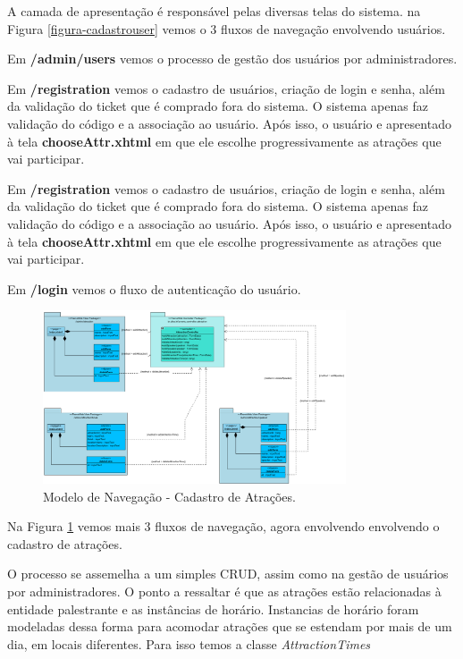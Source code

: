 A camada de apresentação é responsável pelas diversas telas do sistema. na Figura \ref{figura-cadastrouser} vemos o 3 fluxos de navegação envolvendo usuários.

Em \textbf{/admin/users} vemos o processo de gestão dos usuários por administradores.

Em \textbf{/registration} vemos o cadastro de usuários, criação de login e senha, além da validação do ticket que é comprado fora do sistema. O sistema apenas faz validação do código e a associação ao usuário. Após isso, o usuário e apresentado à tela \textbf{chooseAttr.xhtml} em que ele escolhe progressivamente  as atrações que vai participar.

Em \textbf{/registration} vemos o cadastro de usuários, criação de login e senha, além da validação do ticket que é comprado fora do sistema. O sistema apenas faz validação do código e a associação ao usuário. Após isso, o usuário e apresentado à tela \textbf{chooseAttr.xhtml} em que ele escolhe progressivamente  as atrações que vai participar.

Em \textbf{/login} vemos o fluxo de autenticação do usuário.

\begin{figure}[h]
	\centering
	\includegraphics[width=0.8\textwidth]{figuras/ModeloNavegacaoAttr.PNG}
	\caption{Modelo de Navegação - Cadastro de Atrações.}
	\label{figura-cadastroattr}
\end{figure}


Na Figura \ref{figura-cadastroattr} vemos mais 3 fluxos de navegação, agora envolvendo envolvendo o cadastro de atrações.

O processo se assemelha a um simples CRUD, assim como na gestão de usuários por administradores. O ponto a ressaltar é que as atrações estão relacionadas à entidade palestrante e as instâncias de horário. Instancias de horário foram modeladas dessa forma para acomodar atrações que se estendam por mais de um dia, em locais diferentes. Para isso temos a classe \textit{AttractionTimes}
 
